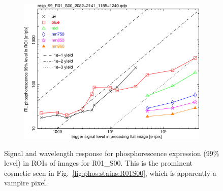 \begin{figure}[!htbp]
\centering
\begin{subfigure}{0.45\textwidth}    
  \centering
  \includegraphics[width=\textwidth]{figures/phosphorescence-survey/phos_resp/resp_99_R01_S00_2082-2141_1185-1240.png}    
\end{subfigure}
\newline
\caption{Signal and wavelength response for phosphorescence expression (99\% level) in ROIs of images for R01\_S00. This is the prominent cosmetic seen in Fig.~\ref{fig:phos:stains:R01S00}, which is apparently a  vampire pixel.}
\label{fig:phos:resp:R01S00}
\end{figure}

